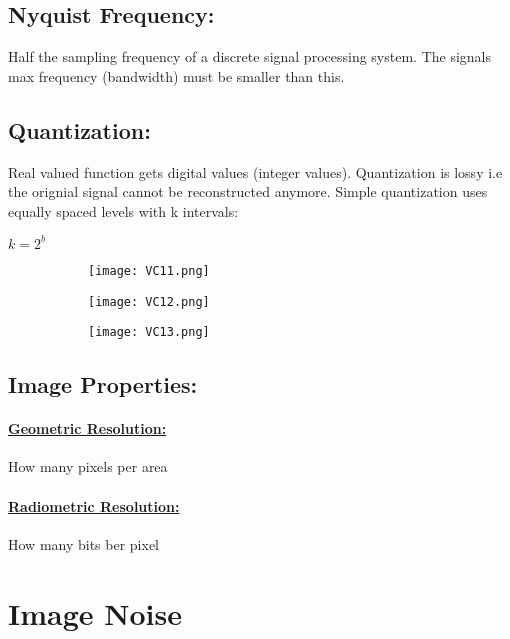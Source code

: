 \documentclass[8pt]{extreport}
\begin{document}
\subsection{ Nyquist Frequency:} Half the sampling frequency of a discrete signal processing system. The signals max frequency (bandwidth) must be smaller than this.

\subsection{ Quantization:} Real valued function gets digital values (integer values). Quantization is lossy i.e the orignial signal cannot be reconstructed anymore. Simple quantization uses equally spaced levels with k intervals:
\begin{center}
$ k= 2^b$
\end{center}
\begin{figure}[H]
\centering
\begin{subfigure}[b]{0.3\linewidth}
\texttt{[image: VC11.png]}
\end{subfigure}
\begin{subfigure}[b]{0.3\linewidth}
\texttt{[image: VC12.png]}
\end{subfigure}
\begin{subfigure}[b]{0.3\linewidth}
\texttt{[image: VC13.png]}
\end{subfigure}
\end{figure}

\subsection{Image Properties:}

\paragraph{\underline{Geometric Resolution:}} How many pixels per area

\paragraph{\underline{Radiometric Resolution:}} How many bits ber pixel

\section{Image Noise}
\end{document}
